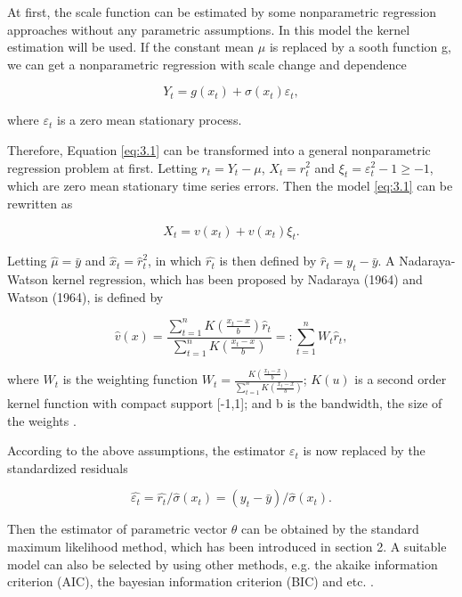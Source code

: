 At first, the scale function can be estimated by some nonparametric regression approaches without any parametric assumptions. In this model the kernel estimation will be used. If the constant mean $\mu$ is replaced by a sooth function g, we can get a nonparametric regression with scale change and dependence

\begin{equation}
\label{equ3.5}
Y_t= g(x_t)+\sigma(x_t)\varepsilon_t,
\end{equation}

where ${\varepsilon_t}$ is a zero mean stationary process.


Therefore, Equation \ref{eq:3.1} can be transformed into a general nonparametric regression problem at first. Letting $ r_{t}=Y_{t}-\mu$, $X_{t}=r_{t}^{2}$ and $\xi_{t}=\varepsilon_{t}^{2}-1 \geq -1$, which are zero mean stationary time series errors. Then the model \ref{eq:3.1} can be rewritten as 

\begin{equation}
\label{equ3.4}
 X_{t} = v(x_{t} )+ v(x_{t})\xi_{t}.
\end{equation}


Letting $\hat{\mu }=\bar{y}$ and $\hat{x}_{t} = \hat{r}_{t}^{2}$, in which $\hat{r_{t}}$ is then defined by $\hat{r}_{t}=y_{t}-\bar{y}$. A Nadaraya-Watson kernel regression, which has been proposed by Nadaraya (1964) and Watson (1964), is defined by

\begin{equation}
\hat{v}(x)=\frac{\sum_{t=1}^{n}K(\frac{x_t-x}{b})\hat{r}_t}{\sum_{t=1}^{n}K(\frac{x_t-x}{b})}=:\sum_{t=1}^nW_t\hat{r}_t,
\end{equation}

where $W_t$ is the weighting function  $W_t= \frac{K(\frac{x_t-x}{b})}{\sum_{t=1}^{n}K(\frac{x_t-x}{b})} $; $K(u)$ is a second order kernel function with compact support [-1,1]; and b is the bandwidth, the size of the weights \citep{Fan1993}. 

According to the above assumptions, the estimator $\varepsilon_{t}$  is now replaced by the standardized residuals

\begin{equation}
\hat{\varepsilon_t }=\hat{r_t}/\hat{\sigma }(x_t)=(y_t-\bar{y})/\hat{\sigma}(x_t). 
\end{equation}

Then the estimator of parametric vector $\theta$ can be obtained by the standard maximum likelihood method, which has been introduced in section 2. A suitable model can also be selected by using other methods, e.g. the akaike information criterion (AIC), the bayesian information criterion (BIC) and etc. \citep{Feng2004}.




